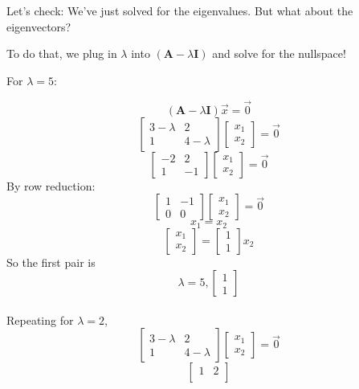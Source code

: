 \begin{enumerate}
{	Let's check: We've just solved for the eigenvalues. But what about the eigenvectors? 
	
	To do that, we plug in $\lambda$ into $(\mathbf{A} - \lambda \mathbf{I})$ and solve for the nullspace!
	
	For $\lambda = 5$:
	
	$$
	(\mathbf{A} - \lambda \mathbf{I})\vec{x} = \vec{0}
	$$
	$$\begin{bmatrix}
	3 - \lambda & 2 \\
	1 & 4 - \lambda
	\end{bmatrix}
	\begin{bmatrix} 
	x_1 \\
	x_2
	\end{bmatrix}= \vec{0}
	$$
	$$\begin{bmatrix}
	-2 & 2 \\
	1 & -1
	\end{bmatrix}
	\begin{bmatrix} 
	x_1 \\
	x_2
	\end{bmatrix} = \vec{0}
	$$
	By row reduction:
	$$\begin{bmatrix}
	1 & -1 \\
	0 & 0
	\end{bmatrix}
	\begin{bmatrix} 
	x_1 \\
	x_2
	\end{bmatrix} = \vec{0}
	$$
	$$
	x_1 = x_2 
	$$
	$$
	\begin{bmatrix} 
	x_1 \\
	x_2
	\end{bmatrix} = 
	\begin{bmatrix} 
	1 \\
	1
	\end{bmatrix}x_2
	$$
	So the first pair is $$\lambda = 5, \begin{bmatrix} 
	1 \\
	1
	\end{bmatrix}$$ \\
	Repeating for $\lambda = 2$, 
	$$\begin{bmatrix}
	3 - \lambda & 2 \\
	1 & 4 - \lambda
	\end{bmatrix}
	\begin{bmatrix} 
	x_1 \\
	x_2
	\end{bmatrix}= \vec{0}
	$$
	$$\begin{bmatrix}
	1 & 2 \\

\end{bmatrix}$$}
\end{enumerate}
